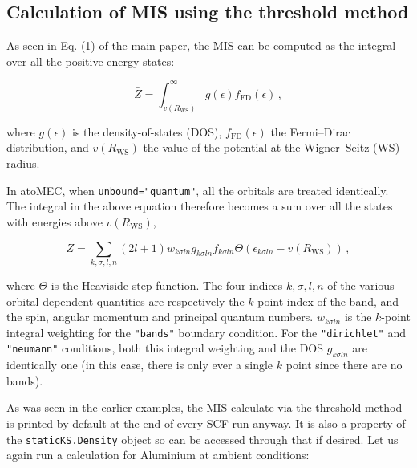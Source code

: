 \documentclass[preprint,aps]{revtex4-2}
\begin{document}
\hypertarget{calculation-of-mis-using-the-threshold-method}{%
\subsection{Calculation of MIS using the threshold
method}\label{calculation-of-mis-using-the-threshold-method}}

As seen in Eq. (1) of the main paper, the MIS can be computed as the
integral over all the positive energy states:

\begin{equation}
\bar{Z} = \int_{v(R_\textrm{WS})}^\infty g(\epsilon) f_\textrm{FD}(\epsilon)\,,
\end{equation}

where \(g(\epsilon)\) is the density-of-states (DOS),
\(f_\textrm{FD}(\epsilon)\) the Fermi--Dirac distribution, and
\(v(R_\textrm{WS})\) the value of the potential at the Wigner--Seitz
(WS) radius.

In atoMEC, when \texttt{unbound="quantum"}, all the orbitals are treated
identically. The integral in the above equation therefore becomes a sum
over all the states with energies above \(v(R_\textrm{WS})\),

\begin{equation}
\bar{Z} = \sum_{k,\sigma,l,n} (2l+1) w_{k\sigma ln} g_{k\sigma ln} f_{k\sigma ln} \Theta(\epsilon_{k\sigma ln}-v(R_\textrm{WS}))\,,
\end{equation}

where \(\Theta\) is the Heaviside step function. The four indices
\(k,\sigma,l,n\) of the various orbital dependent quantities are
respectively the \(k\)-point index of the band, and the spin, angular
momentum and principal quantum numbers. \(w_{k\sigma ln}\) is the
\(k\)-point integral weighting for the \texttt{"bands"} boundary
condition. For the \texttt{"dirichlet"} and \texttt{"neumann"}
conditions, both this integral weighting and the DOS \(g_{k\sigma ln}\)
are identically one (in this case, there is only ever a single \(k\)
point since there are no bands).

As was seen in the earlier examples, the MIS calculate via the threshold
method is printed by default at the end of every SCF run anyway. It is
also a property of the \texttt{staticKS.Density} object so can be
accessed through that if desired. Let us again run a calculation for
Aluminium at ambient conditions:
\end{document}
